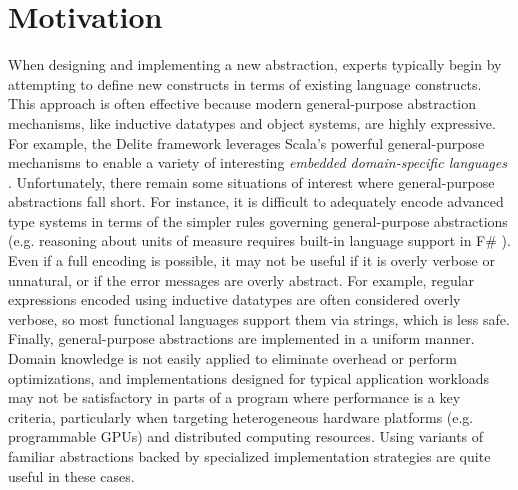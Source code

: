 \documentclass{llncs}
\begin{document}
\section{Motivation}
When designing and implementing a new abstraction, experts typically begin by attempting to define new constructs in terms of existing language constructs.
This approach is often effective because modern {general-purpose} abstraction mechanisms, like inductive datatypes and object systems, are highly expressive.  
For example, the Delite framework leverages Scala's powerful general-purpose mechanisms to enable a variety of interesting \emph{embedded domain-specific languages} \cite{delite}. 
Unfortunately, there remain some situations of interest where general-purpose abstractions fall short. 
For instance, it is difficult to adequately encode advanced type systems in terms of the simpler rules governing general-purpose abstractions (e.g. reasoning about units of measure requires built-in language support in F\# \cite{units-of-measure}). 
Even if a full encoding is possible, it may not be useful if it is overly verbose or unnatural, or if the error messages are overly abstract. For example, regular expressions encoded using inductive datatypes are often considered overly verbose, so most functional languages support them via strings, which is less safe. 
Finally, general-purpose abstractions are implemented in a uniform manner. Domain knowledge is not easily applied to eliminate overhead or perform optimizations, and implementations designed for typical application workloads may not be satisfactory in parts of a program where performance is a key criteria, particularly when targeting heterogeneous hardware platforms (e.g. programmable GPUs) and distributed computing resources. Using variants of familiar abstractions backed by specialized implementation strategies are quite useful in these cases.

\end{document}
